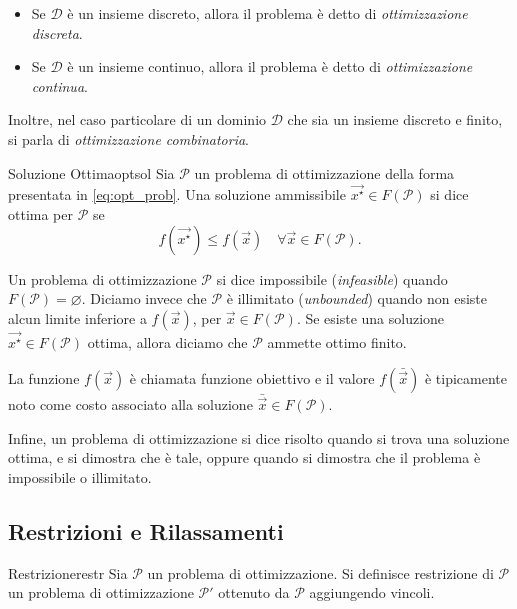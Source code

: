 \begin{itemize}
    \item Se \( \mathcal{D} \) è un insieme discreto, allora il problema è detto di \textit{ottimizzazione discreta}.
    \item Se \( \mathcal{D} \) è un insieme continuo, allora il problema è detto di \textit{ottimizzazione continua}.
\end{itemize}
Inoltre, nel caso particolare di un dominio
\(
    \mathcal{D}
\)
che sia un insieme discreto e finito, si parla di \textit{ottimizzazione combinatoria}.
\begin{defbox}{Soluzione Ottima}{optsol}
    Sia \( \mathcal{P} \) un problema di ottimizzazione della forma presentata in \eqref{eq:opt_prob}. Una soluzione
    ammissibile \( \vec{x^{\star}} \in F(\mathcal{P}) \) si dice ottima per \( \mathcal{P} \) se
    \[
        f(\vec{x^{\star}}) \leq f(\vec{x}) \quad \forall \vec{x} \in F(\mathcal{P}).
    \]
\end{defbox}
Un problema di ottimizzazione \( \mathcal{P} \) si dice impossibile (\textit{infeasible}) quando
\(
    F(\mathcal{P}) = \varnothing.
\)
Diciamo invece che
\(
    \mathcal{P}
\)
è illimitato (\textit{unbounded}) quando non esiste alcun limite inferiore a \( f(\vec{x}) \), per \( \vec{x} \in
F(\mathcal{P}) \). Se esiste una soluzione \( \vec{x^{\star}} \in F(\mathcal{P}) \) ottima, allora
diciamo che \( \mathcal{P} \) ammette ottimo finito.

La funzione \( f(\vec{x}) \) è chiamata funzione obiettivo e il valore \( f(\bar{\vec{x}}) \) è tipicamente noto come
costo associato alla soluzione \( \bar{\vec{x}} \in F(\mathcal{P}) \).

Infine, un problema di ottimizzazione si dice risolto quando si trova una soluzione ottima, e si dimostra che è tale,
oppure quando si dimostra che il problema è impossibile o illimitato.

\subsection{Restrizioni e Rilassamenti}

\begin{defbox}{Restrizione}{restr}
    Sia \( \mathcal{P} \) un problema di ottimizzazione. Si definisce restrizione di \( \mathcal{P} \) un problema di
    ottimizzazione \( \mathcal{P}' \) ottenuto da \( \mathcal{P} \) aggiungendo vincoli.
\end{defbox}

